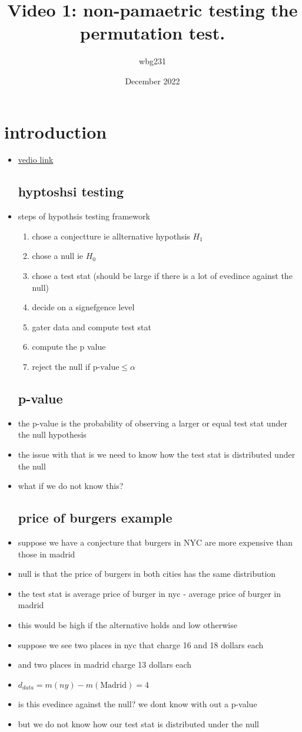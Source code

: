 \documentclass{article}
\title{Video 1: non-pamaetric testing the permutation test. }
\author{wbg231 }
\date{December 2022}
\begin{document}
\maketitle

\section{introduction}
\begin{itemize}
\item \href{https://www.youtube.com/watch?v=frSkAi36qd0}{vedio link}
\subsection{hyptoshsi testing }
\item steps of hypothsis testing framework 
\begin{enumerate}
    \item chose a conjectture ie allternative hypothsis $H_{1}$
    \item chose a null ie $H_{0}$
    \item chose a test stat (should be large if there is a lot of evedince against the null) 
    \item decide on a signefgence level
    \item gater data and compute test stat 
    \item compute the p value 
    \item reject the null if $\text{p-value}\leq \alpha$

\end{enumerate}
\subsection{p-value}
\item the p-value is the probability of observing a larger or equal test stat under the null hypothesis
\item the issue with that is we need to know how the test stat is distributed under the null 
\item what if we do not know this?
\subsection{price of burgers example}
\item suppose we have a conjecture that burgers in NYC are more expensive  than those in madrid 
\item null is that the price of burgers in both cities has the same distribution 
\item the test stat is average price of burger in nyc - average price of burger in madrid 
\item this would be high if the alternative holds and low otherwise
\item suppose we see two places in nyc that charge 16 and 18 dollars each 
\item and two places in madrid charge 13 dollars each 
\item $d_{data}=m(ny)-m(\text{Madrid})=4$
\item is this evedince against the null? we dont know with out a p-value 
\item but we do not know how our test stat is distributed under the null

\end{itemize}
\end{document}

